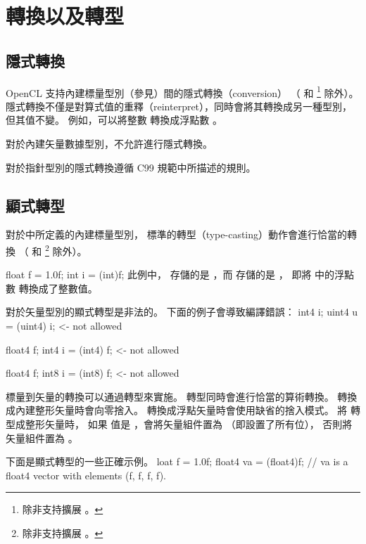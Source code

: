 \section[sec:conversionCast]{轉換以及轉型}

\subsection[sec:implicityConversion]{隱式轉換}

OpenCL 支持內建標量型別（參見）間的隱式轉換（conversion）
（ 和 \footnote{除非支持擴展 。} 除外）。
隱式轉換不僅是對算式值的重釋（reinterpret），同時會將其轉換成另一種型別，但其值不變。
例如，可以將整數  轉換成浮點數 。

對於內建矢量數據型別，不允許進行隱式轉換。

對於指針型別的隱式轉換遵循 C99 規範中所描述的規則。

\subsection{顯式轉型}

對於中所定義的內建標量型別，
標準的轉型（type-casting）動作會進行恰當的轉換
（ 和 \footnote{除非支持擴展 。} 除外）。

\startclc[indentnext=no]
float	f = 1.0f;
int	i = (int)f;
\stopclc
此例中，
 存儲的是 ，而  存儲的是 ，
即將  中的浮點數  轉換成了整數值。

對於矢量型別的顯式轉型是非法的。
下面的例子會導致編譯錯誤：
\startclc
int4	i;
uint4	u = (uint4) i;	<- not allowed

float4	f;
int4	i = (int4) f;	<- not allowed

float4	f;
int8	i = (int8) f;	<- not allowed
\stopclc

標量到矢量的轉換可以通過轉型來實施。
轉型同時會進行恰當的算術轉換。
轉換成內建整形矢量時會向零捨入。
轉換成浮點矢量時會使用缺省的捨入模式。
將  轉型成整形矢量時，
如果  值是 ，會將矢量組件置為  （即設置了所有位），
否則將矢量組件置為 。

下面是顯式轉型的一些正確示例。
\startclc
loat	f = 1.0f;
float4	va = (float4)f;
// va is a float4 vector with elements (f, f, f, f).

